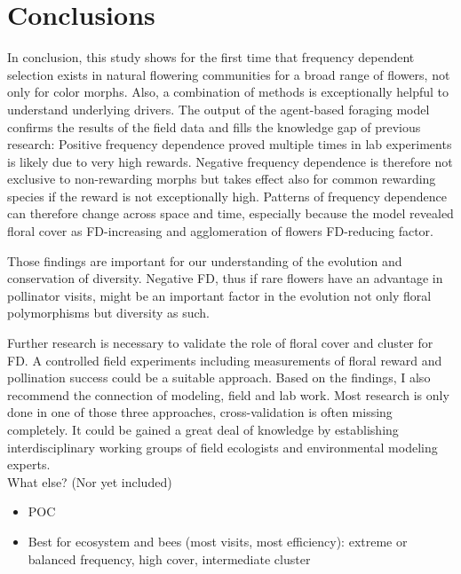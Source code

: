 \section{Conclusions}
\label{ch:conclusions}
In conclusion, this study shows for the first time that frequency dependent selection exists in natural flowering communities for a broad range of flowers, not only for color morphs. Also, a combination of methods is exceptionally helpful to understand underlying drivers. The output of the agent-based foraging model confirms the results of the field data and fills the knowledge gap of previous research: Positive frequency dependence proved multiple times in lab experiments is likely due to very high rewards. Negative frequency dependence is therefore not exclusive to non-rewarding morphs but takes effect also for common rewarding species if the reward is not exceptionally high. Patterns of frequency dependence can therefore change across space and time, especially because the model revealed floral cover as FD-increasing and agglomeration of flowers FD-reducing factor.

Those findings are important for our understanding of the evolution and conservation of diversity. Negative FD, thus if rare flowers have an advantage in pollinator visits, might be an important factor in the evolution not only floral polymorphisms but diversity as such. 

Further research is necessary to validate the role of floral cover and cluster for FD. A controlled field experiments including measurements of floral reward and pollination success could be a suitable approach. Based on the findings, I also recommend the connection of modeling, field and lab work. Most research is only done in one of those three approaches, cross-validation is often missing completely. It could be gained a great deal of knowledge by establishing interdisciplinary working groups of field ecologists and environmental modeling experts. \\

What else? (Nor yet included)
\begin{itemize}
	\item POC
	\item Best for ecosystem and bees (most visits, most efficiency): extreme or balanced frequency, high cover, intermediate cluster
\end{itemize}

